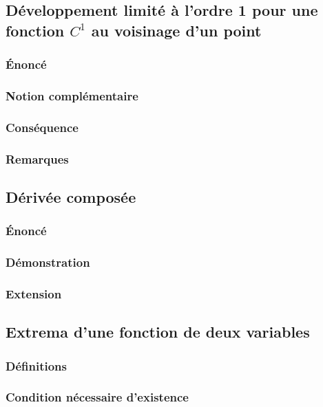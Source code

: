 \documentclass[12pt,a4paper,french]{book}
\begin{document}
		\subsection{Développement limité à l'ordre 1 pour une fonction $C^{1}$ au voisinage d'un point}
			\subsubsection{Énoncé}
			\subsubsection{Notion complémentaire}
			\subsubsection{Conséquence}
			\subsubsection{Remarques}
		\subsection{Dérivée composée}
			\subsubsection{Énoncé}
			\subsubsection{Démonstration}
			\subsubsection{Extension}
		\subsection{Extrema d'une fonction de deux variables}
			\subsubsection{Définitions}
			\subsubsection{Condition nécessaire d'existence}



	
	
	
	
	
	
	
	
\end{document}
